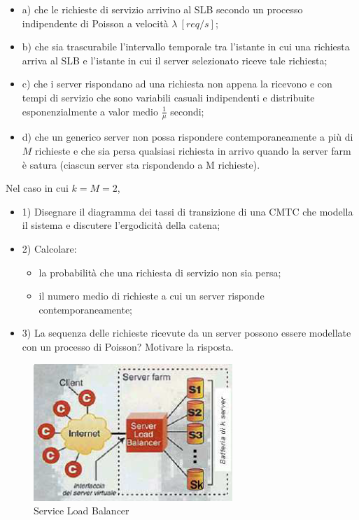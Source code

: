 \begin{itemize}

\item{a)} che le richieste di servizio arrivino al SLB secondo un processo 
indipendente di Poisson a velocità $\lambda\ [req/s]$; 
\item{b)} che sia trascurabile l’intervallo temporale tra l’istante in cui una 
richiesta arriva al SLB e l’istante in cui il server selezionato riceve 
tale richiesta; 
\item{c)} che i server rispondano ad una richiesta non appena la ricevono e con 
tempi di servizio che sono variabili casuali indipendenti e distribuite 
esponenzialmente a valor medio $\frac{1}{\mu}$ secondi; 
\item{d)} che un generico server non possa rispondere contemporaneamente a più di $M$ 
richieste e che sia persa qualsiasi richiesta in arrivo quando la server 
farm è satura (ciascun server sta rispondendo a M richieste).

\end{itemize}

Nel caso in cui $k=M=2$,

\begin{itemize}
\item{1)} Disegnare il diagramma dei tassi di transizione di una CMTC che modella il 
sistema e discutere l’ergodicità della catena; 
\item{2)} Calcolare: 

\begin{itemize} 
\item la probabilità che una richiesta di servizio non sia persa; 
\item il numero medio di richieste a cui un server risponde 
contemporaneamente; 
\end{itemize}

\item{3)} La sequenza delle richieste ricevute da un server possono essere modellate 
con un processo di Poisson? Motivare la risposta.

\end{itemize}

\begin{center}
\begin{figure}[H]
\centering
\includegraphics[scale=1]{figures/ex/slb.png}
\caption{Service Load Balancer}
\end{figure}
\end{center}

